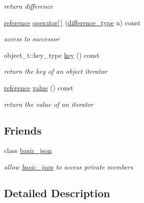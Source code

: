 \begin{DoxyCompactItemize}
\begin{DoxyCompactList}\small\item\em return difference \end{DoxyCompactList}\item 
\mbox{\hyperlink{classnlohmann_1_1basic__json_1_1iter__impl_ae09599e9cb4a947020a0265c0c4f3d5e}{reference}} \mbox{\hyperlink{classnlohmann_1_1basic__json_1_1iter__impl_ab58eb87c2362183da21c70be74c2b38c}{operator\mbox{[}$\,$\mbox{]}}} (\mbox{\hyperlink{classnlohmann_1_1basic__json_1_1iter__impl_aa3d908ee643e5938d32e5f6d261d7715}{difference\+\_\+type}} n) const
\begin{DoxyCompactList}\small\item\em access to successor \end{DoxyCompactList}\item 
object\+\_\+t\+::key\+\_\+type \mbox{\hyperlink{classnlohmann_1_1basic__json_1_1iter__impl_a030a45b63b70e12b18ad4f6c1c4f1239}{key}} () const
\begin{DoxyCompactList}\small\item\em return the key of an object iterator \end{DoxyCompactList}\item 
\mbox{\hyperlink{classnlohmann_1_1basic__json_1_1iter__impl_ae09599e9cb4a947020a0265c0c4f3d5e}{reference}} \mbox{\hyperlink{classnlohmann_1_1basic__json_1_1iter__impl_a92e849ca687355935c02f492be936b68}{value}} () const
\begin{DoxyCompactList}\small\item\em return the value of an iterator \end{DoxyCompactList}\end{DoxyCompactItemize}
\subsection*{Friends}
\begin{DoxyCompactItemize}
\item 
class \mbox{\hyperlink{classnlohmann_1_1basic__json_1_1iter__impl_ada3100cdb8700566051828f1355fa745}{basic\+\_\+json}}
\begin{DoxyCompactList}\small\item\em allow \mbox{\hyperlink{classnlohmann_1_1basic__json}{basic\+\_\+json}} to access private members \end{DoxyCompactList}\end{DoxyCompactItemize}


\subsection{Detailed Description}
